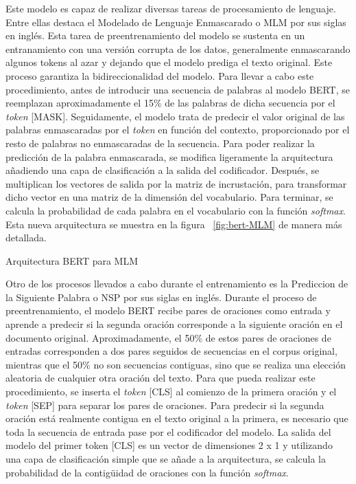 Este modelo es capaz de realizar diversas tareas de procesamiento de lenguaje. Entre ellas destaca el Modelado de Lenguaje Enmascarado o MLM por sus siglas en inglés. Esta tarea de preentrenamiento del modelo se sustenta en un entranamiento con una versión corrupta de los datos, generalmente enmascarando algunos tokens al azar y dejando que el modelo prediga el texto original. Este proceso garantiza la bidireccionalidad del modelo. Para llevar a cabo este procedimiento, antes de introducir una secuencia de palabras al modelo BERT, se reemplazan aproximadamente el 15\% de las palabras de dicha secuencia por el \textit{token} [MASK]. Seguidamente, el modelo trata de predecir el valor original de las palabras enmascaradas por el \textit{token} en función del contexto, proporcionado por el resto de palabras no enmascaradas de la secuencia. Para poder realizar la predicción de la palabra enmascarada, se modifica ligeramente la arquitectura añadiendo una capa de clasificación a la salida del codificador. Después, se multiplican los vectores de salida por la matriz de incrustación, para transformar dicho vector en una matriz de la dimensión del vocabulario. Para terminar, se calcula la probabilidad de cada palabra en el vocabulario con la función \textit{softmax}. Esta nueva arquitectura se muestra en la figura ~\ref{fig:bert-MLM} de manera más detallada.

%
{Arquitectura BERT para MLM}


Otro de los procesos llevados a cabo durante el entrenamiento es la Prediccion de la Siguiente Palabra o NSP por sus siglas en inglés. Durante el proceso de preentrenamiento, el modelo BERT recibe pares de oraciones como entrada y aprende a predecir si la segunda oración corresponde a la siguiente oración en el documento original. Aproximadamente, el 50\% de estos pares de oraciones de entradas corresponden a dos pares seguidos de secuencias en el corpus original, mientras que el 50\% no son secuencias contiguas, sino que se realiza una elección aleatoria de cualquier otra oración del texto. Para que pueda realizar este procedimiento, se inserta el \textit{token} [CLS] al comienzo de la primera oración y el \textit{token} [SEP] para separar los pares de oraciones.
Para predecir si la segunda oración está realmente contigua en el texto original a la primera, es necesario que toda la secuencia de entrada pase por el codificador del modelo. La salida del modelo del primer token [CLS] es un vector de dimensiones 2 x 1 y utilizando una capa de clasificación simple que se añade a la arquitectura, se calcula la probabilidad de la contigüidad de oraciones con la función \textit{softmax}.

